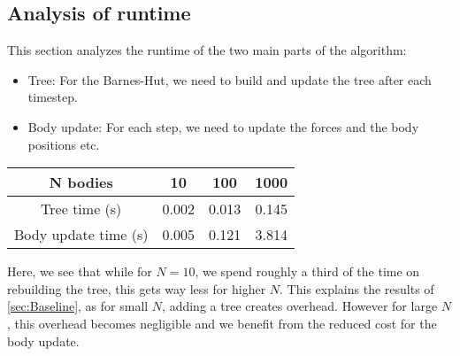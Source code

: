 \documentclass[a4paper]{scrartcl}
\begin{document}
        \subsection{Analysis of runtime}
            This section analyzes the runtime of the two main parts of the
            algorithm:
            \begin{itemize}
                \item Tree: For the Barnes-Hut, we need to build and update the tree after each timestep.
                \item Body update: For each step, we need to update the forces and the body positions etc.
            \end{itemize}
            \noindent\begin{tabular}{c|c|c|c}
                N bodies & 10 & 100 & 1000 \\
                \hline
                Tree time (s) & 0.002 & 0.013 & 0.145 \\
                Body update time (s) & 0.005 & 0.121 & 3.814\\
            \end{tabular}
            Here, we see that while for $N=10$, we spend roughly a third of the
            time on rebuilding the tree, this gets way less for higher $N$. This
            explains the results of \ref{sec:Baseline}, as for small $N$, adding
            a tree creates overhead. However for large $N$, this overhead
            becomes negligible and we benefit from the reduced cost for the body
            update.
\end{document}

